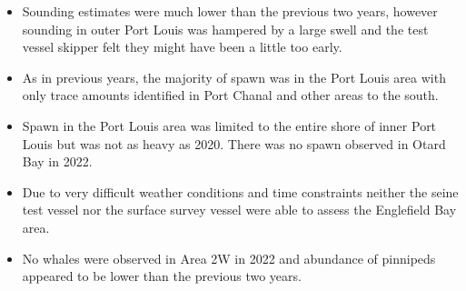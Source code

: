 \begin{itemize}

\item Sounding estimates were much lower than the previous two years,
however sounding in outer Port Louis was hampered by a large swell and
the test vessel skipper felt they might have been a little too early.

\item As in previous years, the majority of spawn was in the Port Louis area
with only trace amounts identified in Port Chanal and other areas to the south.

\item Spawn in the Port Louis area was limited to the entire shore of inner Port Louis
but was not as heavy as 2020.
There was no spawn observed in Otard Bay in 2022.

\item Due to very difficult weather conditions and time constraints
neither the seine test vessel nor the surface survey vessel
were able to assess the Englefield Bay area.

\item No whales were observed in Area 2W in 2022 and
abundance of pinnipeds appeared to be lower than the previous two years.

\end{itemize}